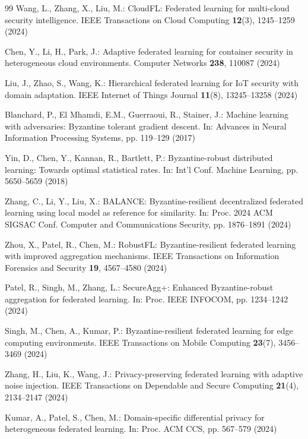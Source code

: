 \documentclass[12pt,a4paper]{article}
\theoremstyle{definition}
\begin{document}
\begin{thebibliography}{99}
Wang, L., Zhang, X., Liu, M.: CloudFL: Federated learning for multi-cloud security intelligence. IEEE Transactions on Cloud Computing \textbf{12}(3), 1245--1259 (2024)

Chen, Y., Li, H., Park, J.: Adaptive federated learning for container security in heterogeneous cloud environments. Computer Networks \textbf{238}, 110087 (2024)

Liu, J., Zhao, S., Wang, K.: Hierarchical federated learning for IoT security with domain adaptation. IEEE Internet of Things Journal \textbf{11}(8), 13245--13258 (2024)

Blanchard, P., El Mhamdi, E.M., Guerraoui, R., Stainer, J.: Machine learning with adversaries: Byzantine tolerant gradient descent. In: Advances in Neural Information Processing Systems, pp. 119--129 (2017)

Yin, D., Chen, Y., Kannan, R., Bartlett, P.: Byzantine-robust distributed learning: Towards optimal statistical rates. In: Int'l Conf. Machine Learning, pp. 5650--5659 (2018)

Zhang, C., Li, Y., Liu, X.: BALANCE: Byzantine-resilient decentralized federated learning using local model as reference for similarity. In: Proc. 2024 ACM SIGSAC Conf. Computer and Communications Security, pp. 1876--1891 (2024)

Zhou, X., Patel, R., Chen, M.: RobustFL: Byzantine-resilient federated learning with improved aggregation mechanisms. IEEE Transactions on Information Forensics and Security \textbf{19}, 4567--4580 (2024)

Patel, R., Singh, M., Zhang, L.: SecureAgg+: Enhanced Byzantine-robust aggregation for federated learning. In: Proc. IEEE INFOCOM, pp. 1234--1242 (2024)

Singh, M., Chen, A., Kumar, P.: Byzantine-resilient federated learning for edge computing environments. IEEE Transactions on Mobile Computing \textbf{23}(7), 3456--3469 (2024)

Zhang, H., Liu, K., Wang, J.: Privacy-preserving federated learning with adaptive noise injection. IEEE Transactions on Dependable and Secure Computing \textbf{21}(4), 2134--2147 (2024)

Kumar, A., Patel, S., Chen, M.: Domain-specific differential privacy for heterogeneous federated learning. In: Proc. ACM CCS, pp. 567--579 (2024)


\end{thebibliography}
\end{document}
